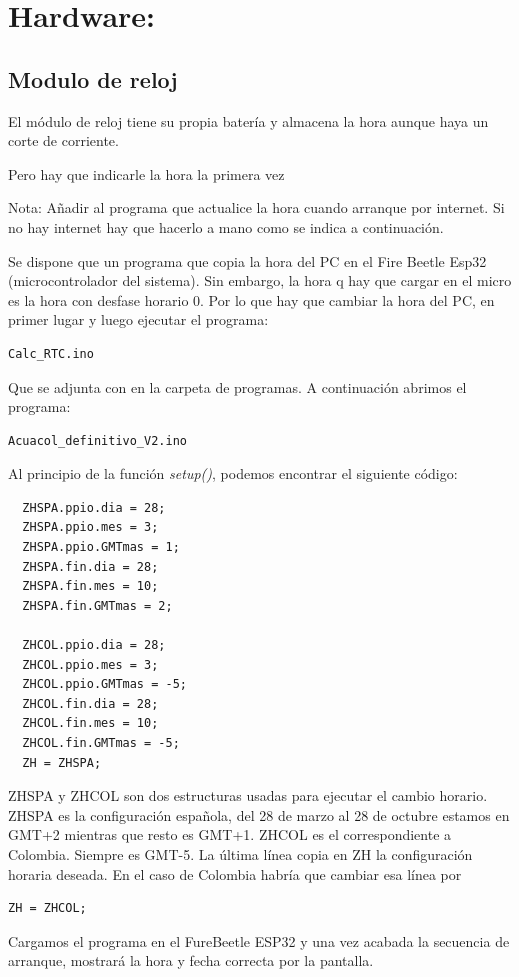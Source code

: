 \chapter{Hardware:}

\section{Modulo de reloj}

El módulo de reloj tiene su propia batería y almacena la hora aunque haya un corte de corriente.

Pero hay que indicarle la hora la primera vez 

Nota: Añadir al programa que actualice la hora cuando arranque por internet. Si no hay internet hay que hacerlo a mano como se indica a continuación.

Se dispone que un programa que copia la hora del PC en el Fire Beetle Esp32 (microcontrolador del sistema). Sin embargo, la hora q hay que cargar en el micro es la hora con desfase horario 0. Por lo que hay que cambiar la hora del PC, en primer lugar y luego ejecutar el programa:
\begin{verbatim}
Calc_RTC.ino             
\end{verbatim}
Que se adjunta con en la carpeta de programas. A continuación abrimos el programa: 
\begin{verbatim}
Acuacol_definitivo_V2.ino             
\end{verbatim}
Al principio de la función \emph{setup()}, podemos encontrar el siguiente código:
\begin{verbatim}
  ZHSPA.ppio.dia = 28;
  ZHSPA.ppio.mes = 3;
  ZHSPA.ppio.GMTmas = 1;
  ZHSPA.fin.dia = 28;
  ZHSPA.fin.mes = 10;
  ZHSPA.fin.GMTmas = 2;

  ZHCOL.ppio.dia = 28;
  ZHCOL.ppio.mes = 3;
  ZHCOL.ppio.GMTmas = -5;
  ZHCOL.fin.dia = 28;
  ZHCOL.fin.mes = 10;
  ZHCOL.fin.GMTmas = -5;
  ZH = ZHSPA;        
\end{verbatim}
ZHSPA y ZHCOL son dos estructuras usadas para ejecutar el cambio horario. ZHSPA es la configuración española, del 28 de marzo al 28 de octubre estamos en GMT+2 mientras que resto es GMT+1. ZHCOL es el correspondiente a Colombia. Siempre es GMT-5. La última línea copia en ZH la configuración horaria deseada. En el caso de Colombia habría que cambiar esa línea por 
\begin{verbatim}
ZH = ZHCOL;        
\end{verbatim}

Cargamos el programa en el FureBeetle ESP32 y una vez acabada la secuencia de arranque, mostrará la hora y fecha correcta por la pantalla.

